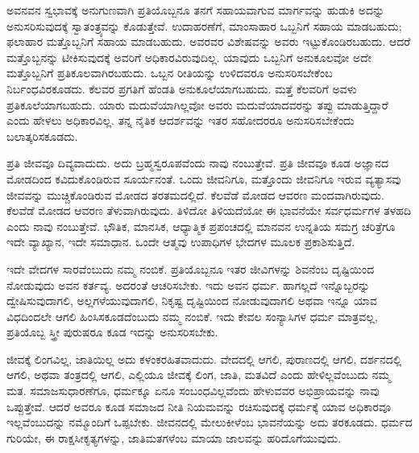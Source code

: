\vspace{0.2cm}

ಅವನವನ ಸ್ವಭಾವಕ್ಕೆ ಅನುಗುಣವಾಗಿ ಪ್ರತಿಯೊಬ್ಬನೂ ತನಗೆ ಸಹಾಯವಾಗುವ ಮಾರ್ಗವನ್ನು ಹುಡುಕಿ ಅದನ್ನು ಅನುಸರಿಸುವುದಕ್ಕೆ ಸ್ವಾತಂತ್ರ್ಯವನ್ನು ಕೊಡುತ್ತೇವೆ. ಉದಾ\break ಹರಣೆಗೆ, ಮಾಂಸಾಹಾರ ಒಬ್ಬನಿಗೆ ಸಹಾಯ ಮಾಡಬಹುದು; ಫಲಾಹಾರ ಮತ್ತೊಬ್ಬನಿಗೆ ಸಹಾಯ ಮಾಡಬಹುದು. ಅವರವರ ವಿಶೇಷವನ್ನು ಅವರು ಇಟ್ಟುಕೊಂಡಿರಬಹುದು. ಆದರೆ ಮತ್ತೊಬ್ಬನನ್ನು ಟೀಕಿಸುವುದಕ್ಕೆ ಅವರಿಗೆ ಅಧಿಕಾರವಿರುವುದಿಲ್ಲ. ಯಾವುದು ಒಬ್ಬನಿಗೆ ಅನುಕೂಲವೋ ಅದೇ ಮತ್ತೊಬ್ಬನಿಗೆ ಪ್ರತಿಕೂಲವಾಗಿರಬಹುದು. ಒಬ್ಬನ ರೀತಿಯನ್ನು ಉಳಿದವರೂ ಅನುಸರಿಸಬೇಕೆಂಬ ನಿರ್ಬಂಧವಿರಕೂಡದು. ಕೆಲವರ ಪ್ರಗತಿಗೆ ಹೆಂಡತಿ ಅನುಕೂಲೆಯಾಗಬಹುದು. ಮತ್ತೆ ಕೆಲವರಿಗೆ ಅವಳು ಪ್ರತಿಕೂಲೆಯಾಗಬಹುದು. ಯಾರು ಮದುವೆಯಾಗಿಲ್ಲವೋ ಅವರು ಮದುವೆಯಾದವರನ್ನು ತಪ್ಪು ಮಾಡುತ್ತಿದ್ದಾರೆ ಎಂದು ಹೇಳಲು ಅಧಿಕಾರವಿಲ್ಲ. ತನ್ನ ನೈತಿಕ ಆದರ್ಶವನ್ನು ಇತರ ಸಹೋದರರೂ ಅನುಸರಿಸಬೇಕೆಂದು ಬಲಾತ್ಕರಿಸಕೂಡದು.

\vspace{0.1cm}

ಪ್ರತಿ ಜೀವವೂ ದಿವ್ಯವಾದುದು. ಅದು ಬ್ರಹ್ಮಸ್ವರೂಪವೆಂದು ನಾವು ನಂಬುತ್ತೇವೆ. ಪ್ರತಿ ಜೀವವೂ ಕೂಡ ಅಜ್ಞಾನದ ಮೋಡದಿಂದ ಕವಿದುಕೊಂಡಿರುವ ಸೂರ್ಯನಂತೆ. ಒಂದು ಜೀವನಿಗೂ, ಮತ್ತೊಂದು ಜೀವನಿಗೂ ಇರುವ ವ್ಯತ್ಯಾಸವು ಜೀವವನ್ನು ಮುಚ್ಚಿಕೊಂಡಿರುವ ಮೋಡದ ತರತಮದಲ್ಲಿದೆ. ಕೆಲವೆಡೆ ಮೋಡದ ಆವರಣ ಮಂದವಾಗಿರುವುದು. ಕೆಲವೆಡೆ ಮೋಡದ ಆವರಣ ತೆಳುವಾಗಿರುವುದು. ತಿಳಿದೋ ತಿಳಿಯದೆಯೋ ಈ ಭಾವನೆಯೇ ಸರ್ವಧರ್ಮಗಳ ತಳಹದಿ ಎಂದು ನಾವು ನಂಬುತ್ತೇವೆ. ಭೌತಿಕ, ಮಾನಸಿಕ, ಆಧ್ಯಾತ್ಮಿಕ ಪ್ರಪಂಚದಲ್ಲಿ ಮಾನವನ ಉನ್ನತಿಯ ಸಮಗ್ರ ಚರಿತ್ರೆಗೂ ಇದೇ ವ್ಯಾಖ್ಯಾನ, ಇದೇ ಸಮಾಧಾನ. ಒಂದೇ ಆತ್ಮವು ಉಪಾಧಿಗಳ ಭೇದಗಳ ಮೂಲಕ ಪ್ರಕಾಶಿಸುತ್ತಿದೆ.

\vspace{0.2cm}

ಇದೇ ವೇದಗಳ ಸಾರವೆಂಬುದು ನಮ್ಮ ನಂಬಿಕೆ. ಪ್ರತಿಯೊಬ್ಬನೂ ಇತರ ಜೀವಿಗಳನ್ನು ಶಿವನೆಂಬ ದೃಷ್ಟಿಯಿಂದ ನೋಡುವುದು ಅವನ ಕರ್ತವ್ಯ. ಅದರಂತೆ ಆಚರಿಸಬೇಕು. ಇದು ಅವನ ಧರ್ಮ. ಹಾಗಲ್ಲದೆ ಇನ್ನೊಬ್ಬರನ್ನು ದ್ವೇಷಿಸುವುದಾಗಲಿ, ಅಲ್ಲಗಳೆಯುವುದಾಗಲಿ, ನಿಕೃಷ್ಟ ದೃಷ್ಟಿಯಿಂದ ನೋಡುವುದಾಗಲಿ ಅಥವಾ ಇನ್ನೂ ಯಾವ ವಿಧದಿಂದಲೇ ಆಗಲಿ ಹಿಂಸಿಸಕೂಡದೆಂಬುದು ನಮ್ಮ ನಂಬಿಕೆ. ಇದು ಕೇವಲ ಸಂನ್ಯಾಸಿಗಳ ಧರ್ಮ ಮಾತ್ರವಲ್ಲ, ಪ್ರತಿಯೊಬ್ಬ ಸ್ತ್ರೀ ಪುರುಷರೂ ಕೂಡ ಇದನ್ನು ಅನುಸರಿಸಬೇಕು.

\vspace{0.2cm}

ಜೀವಕ್ಕೆ ಲಿಂಗವಿಲ್ಲ, ಜಾತಿಯಿಲ್ಲ ಅದು ಕಳಂಕರಹಿತವಾದುದು. ವೇದದಲ್ಲಿ ಆಗಲಿ, ಪುರಾಣದಲ್ಲಿ ಆಗಲಿ, ದರ್ಶನದಲ್ಲಿ ಆಗಲಿ, ಅಥವಾ ತಂತ್ರದಲ್ಲಿ ಆಗಲಿ, ಎಲ್ಲಿಯೂ ಜೀವಕ್ಕೆ ಲಿಂಗ, ಜಾತಿ, ಮತವಿದೆ ಎಂದು ಹೇಳಿಲ್ಲವೆಂಬುದು ನಮ್ಮ ಮತ. ಸಮಾಜಸುಧಾರಣೆಗೂ, ಧರ್ಮಕ್ಕೂ ಏನೂ ಸಂಬಂಧವಿಲ್ಲವೆಂದು ಹೇಳುವವರ ಅಭಿಪ್ರಾಯವನ್ನು ನಾವು ಒಪ್ಪುತ್ತೇವೆ. ಆದರೆ ಅವರೂ ಕೂಡ ಸಮಾಜದ ನೀತಿ ನಿಯಮವನ್ನು ರಚಿಸುವುದಕ್ಕೆ ಧರ್ಮಕ್ಕೆ ಯಾವ ಅಧಿಕಾರವೂ ಇಲ್ಲವೆಂಬುದನ್ನು ನಮ್ಮೊಂದಿಗೆ ಒಪ್ಪಬೇಕು. ಜೀವನದಲ್ಲಿ ಮೇಲುಕೀಳೆಂಬ ಭಾವನೆಯನ್ನು ಅದು ತರಕೂಡದು. ಧರ್ಮದ ಗುರಿಯೇ, ಈ ರಾಕ್ಷಸೀಕೃತ್ಯಗಳನ್ನು, ಜಾತಿಮತಗಳೆಂಬ ಮಾಯಾ ಜಾಲವನ್ನು ಹರಿದೊಗೆಯುವುದು.

\vspace{0.2cm}

